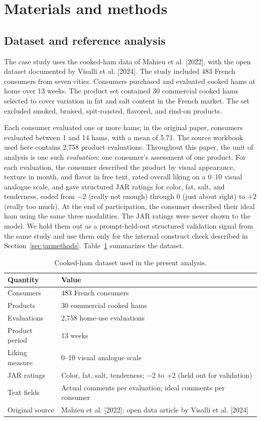 \documentclass[11pt]{article}
\begin{document}
\section{Materials and methods}
\label{sec:methods}

\subsection{Dataset and reference analysis}
\label{sec:dataset}

The case study uses the cooked-ham data of Mahieu et al. [2022], with the open
dataset documented by Visalli et al. [2024]. The study included 483 French
consumers from seven cities. Consumers purchased and evaluated cooked hams at
home over 13 weeks. The product set contained 30 commercial cooked hams
selected to cover variation in fat and salt content in the French market. The
set excluded smoked, braised, spit-roasted, flavored, and rind-on products.

Each consumer evaluated one or more hams; in the original paper, consumers
evaluated between 1 and 14 hams, with a mean of 5.71. The source workbook used
here contains 2,758 product evaluations. Throughout this paper, the unit of
analysis is one such \emph{evaluation}: one consumer's assessment of one
product. For each evaluation, the consumer described the product by visual
appearance, texture in mouth, and flavor in free text, rated overall liking on
a 0--10 visual analogue scale, and gave structured JAR ratings for color, fat,
salt, and tenderness, coded from $-2$ (really not enough) through 0 (just
about right) to $+2$ (really too much). At the end of participation, the
consumer described their ideal ham using the same three modalities. The JAR
ratings were never shown to the model. We hold them out as a prompt-held-out
structured validation signal from the same study and use them only for the
internal construct check described in Section~\ref{sec:jarmethods}. Table~\ref{tab:dataset} summarizes the dataset.

\begin{table}[H]
\centering
\caption{Cooked-ham dataset used in the present analysis.}
\label{tab:dataset}
\begin{tabular}{ll}
\toprule
Quantity & Value \\
\midrule
Consumers & 483 French consumers \\
Products & 30 commercial cooked hams \\
Evaluations & 2,758 home-use evaluations \\
Product period & 13 weeks \\
Liking measure & 0--10 visual analogue scale \\
JAR ratings & Color, fat, salt, tenderness; $-2$ to $+2$ (held out for validation) \\
Text fields & Actual comments per evaluation; ideal comments per consumer \\
Original source & Mahieu et al. [2022]; open data article by Visalli et al. [2024] \\
\bottomrule
\end{tabular}
\end{table}
\end{document}
